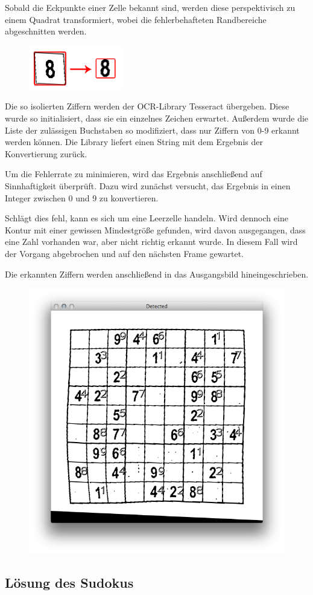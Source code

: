 Sobald die Eckpunkte einer Zelle bekannt sind, werden diese perspektivisch zu einem Quadrat transformiert, wobei die fehlerbehafteten Randbereiche abgeschnitten werden.

\begin{figure}[h!]
    \begin{center}
        \includegraphics[]{Abbildungen/Ziffer}
    \end{center}
\end{figure}

Die so isolierten Ziffern werden der OCR-Library Tesseract übergeben.
Diese wurde so initialisiert, dass sie ein einzelnes Zeichen erwartet. Außerdem wurde die Liste der zulässigen Buchstaben so modifiziert, dass nur Ziffern von 0-9 erkannt werden können.
Die Library liefert einen String mit dem Ergebnis der Konvertierung zurück.

Um die Fehlerrate zu minimieren, wird das Ergebnis anschließend auf Sinnhaftigkeit überprüft.
Dazu wird zunächst versucht, das Ergebnis in einen Integer zwischen 0 und 9 zu konvertieren.

Schlägt dies fehl, kann es sich um eine Leerzelle handeln.
Wird dennoch eine Kontur mit einer gewissen Mindestgröße gefunden, wird davon ausgegangen, dass eine Zahl vorhanden war, aber nicht richtig erkannt wurde.
In diesem Fall wird der Vorgang abgebrochen und auf den nächsten Frame gewartet.

Die erkannten Ziffern werden anschließend in das Ausgangsbild hineingeschrieben.

\begin{figure}[h!]
    \begin{center}
        \includegraphics[width=.5\textwidth]{Abbildungen/detected}
    \end{center}
\end{figure}



\subsection{Lösung des Sudokus}
